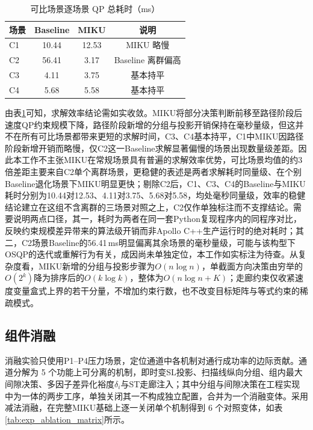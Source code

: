 \documentclass[a4paper,zihao=5]{ctexart}
\theoremstyle{definition}
\begin{document}
\begin{table}[htbp]
\centering
\caption{可比场景逐场景 QP 总耗时（ms）}
\label{tab:exp_qp_percomp}
\small
\begin{tabular}{lccc}
\toprule
\textbf{场景} & \textbf{Baseline} & \textbf{MIKU} & \textbf{说明} \\
\midrule
C1 & 10.44 & 12.53 & MIKU 略慢 \\
C2 & 56.41 & 3.17 & Baseline 离群偏高 \\
C3 & 4.11 & 3.75 & 基本持平 \\
C4 & 5.68 & 5.58 & 基本持平 \\
\bottomrule
\end{tabular}
\end{table}

由表\ref{tab:exp_qp_percomp}可知，求解效率结论需如实收敛。MIKU将部分决策判断前移至路径阶段后速度QP约束规模下降，路径阶段新增的分组与投影开销保持在毫秒量级，但这并不在所有可比场景都带来更短的求解时间，C3、C4基本持平，C1中MIKU因路径阶段新增开销而略慢，仅C2这一Baseline求解显著偏慢的场景出现数量级差距。因此本工作不主张MIKU在常规场景具有普遍的求解效率优势，可比场景均值的约3倍差距主要来自C2单个离群场景，更稳健的表述是两者求解耗时同量级、在个别Baseline退化场景下MIKU明显更快；剔除C2后，C1、C3、C4的Baseline与MIKU耗时分别为10.44对12.53、4.11对3.75、5.68对5.58，均处毫秒同量级，效率的稳健结论建立在这组不含离群的三场景对照之上，C2仅作单独标注而不支撑结论。需要说明两点口径，其一，耗时为两者在同一套Python复现程序内的同程序对比，反映约束规模差异带来的算法级开销而非Apollo C++生产运行时的绝对耗时；其二，C2场景Baseline的56.41\,ms明显偏离其余场景的毫秒量级，可能与该构型下OSQP的迭代或重解行为有关，成因尚未单独定位，本工作如实标注为待查。从复杂度看，MIKU新增的分组与投影步骤为$O(n \log n)$，单截面方向决策由穷举的$O(2^k)$降为排序后的$O(k \log k)$，整体为$O(n \log n + K)$；走廊约束仅收紧速度变量盒式上界的若干分量，不增加约束行数，也不改变目标矩阵与等式约束的稀疏模式。

\subsection{组件消融}
\label{subsec:exp_ablation}

消融实验只使用P1--P4压力场景，定位通道中各机制对通行成功率的边际贡献。通道分解为 5 个功能上可分离的机制，即时变SL投影、扫描线纵向分组、组内最大间隙决策、多因子差异化裕度$\delta_i$与ST走廊注入；其中分组与间隙决策在工程实现中为一体的两步工序，单独关闭其一不构成独立配置，合并为一个消融变体。采用减法消融，在完整MIKU基础上逐一关闭单个机制得到 6 个对照变体，如表\ref{tab:exp_ablation_matrix}所示。
\end{document}
